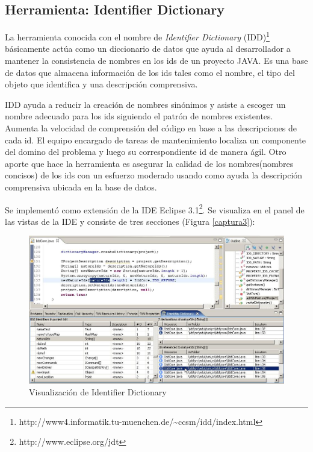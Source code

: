 \documentclass[12pt]{report}
\begin{document}
\subsection{Herramienta: Identifier Dictionary}

La herramienta conocida con el nombre de \textit{Identifier Dictionary} (IDD)\footnote[1]{http://www4.informatik.tu-muenchen.de/\~{}ccsm/idd/index.html} básicamente actúa como un diccionario de datos que ayuda al desarrollador a mantener la consistencia de nombres en los ids de un proyecto JAVA. Es una base de datos que almacena información de los ids tales como el nombre, el tipo del objeto que identifica y una descripción comprensiva.

IDD ayuda a reducir la creación de nombres sinónimos y asiste a escoger un nombre adecuado para los ids siguiendo el patrón de nombres existentes. Aumenta la velocidad de comprensión del código en base a las descripciones de cada id. El equipo encargado de tareas de mantenimiento localiza un componente del domino del problema y luego su correspondiente id de manera ágil. Otro aporte que hace la herramienta es asegurar la calidad de los nombres(nombres concisos) de los ids con un esfuerzo moderado usando como ayuda la descripción comprensiva ubicada en la base de datos\cite{DFPM05,LFBEX07}.

Se implementó como extensión de la IDE Eclipse 3.1\footnote[2]{http://www.eclipse.org/jdt}. Se visualiza en el panel de las vistas de la IDE y consiste de tres secciones (Figura \ref{captura3}):

\begin{figure}[t] %
\centering
\includegraphics[scale= 0.40]{./idd_3.png}
\caption{Visualización de Identifier Dictionary}
\label{captura4}
\end{figure} 
\end{document}
